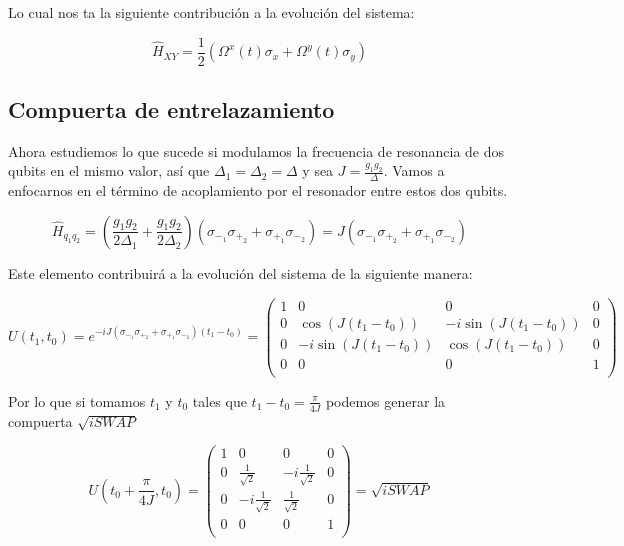 Lo cual nos ta la siguiente contribución a la evolución del sistema:

\begin{equation}
    \hat{H}_{XY} = \frac{1}{2} (\Omega^x(t) \sigma_x + \Omega^y(t) \sigma_y)
\end{equation}

\subsection{Compuerta de entrelazamiento}

Ahora estudiemos lo que sucede si modulamos la frecuencia de resonancia de dos qubits en el mismo valor, así que $\Delta_1 = \Delta_2 = \Delta$ y sea $J = \frac{g_1 g_2}{\Delta}$. Vamos a enfocarnos en el término de acoplamiento por el resonador entre estos dos qubits.

\begin{equation}
    \hat{H}_{q_1 q_2} = (\frac{g_1 g_2}{2 \Delta_1} + \frac{g_1 g_2}{2 \Delta_2}) (\sigma_{-_1} \sigma_{+_2} + \sigma_{+_1} \sigma_{-_2}) = J (\sigma_{-_1} \sigma_{+_2} + \sigma_{+_1} \sigma_{-_2})
\end{equation}

Este elemento contribuirá a la evolución del sistema de la siguiente manera:

\begin{equation}
    U(t_1, t_0) = e^{-i J (\sigma_{-_1} \sigma_{+_2} + \sigma_{+_1} \sigma_{-_2}) (t_1 - t_0)} = 
    \begin{pmatrix}
        1 & 0 & 0 & 0 \\
        0 & \cos(J (t_1 - t_0))  & -i \sin(J (t_1 - t_0)) & 0 \\
        0 & -i \sin(J (t_1 - t_0)) & \cos(J (t_1 - t_0)) & 0 \\
        0 & 0 & 0 & 1 \\
    \end{pmatrix}
\end{equation}

Por lo que si tomamos $t_1$ y $t_0$ tales que $t_1 - t_0 = \frac{\pi}{4J}$ podemos generar la compuerta $\sqrt{iSWAP}$

\begin{equation}
    U(t_0 + \frac{\pi}{4J}, t_0) = 
    \begin{pmatrix}
        1 & 0 & 0 & 0 \\
        0 & \frac{1}{\sqrt{2}}  & -i \frac{1}{\sqrt{2}} & 0 \\
        0 & -i \frac{1}{\sqrt{2}} & \frac{1}{\sqrt{2}} & 0 \\
        0 & 0 & 0 & 1 \\
    \end{pmatrix} = \sqrt{iSWAP}
\end{equation}

